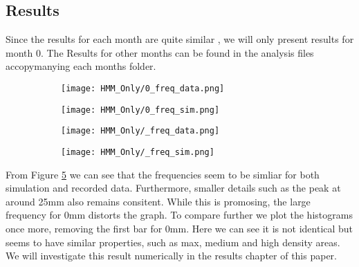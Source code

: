 \subsection{Results}

Since the results for each month are quite similar , we will only present results for month 0. The Results for other months can be found in the analysis files accopymanying each months folder. 

\begin{figure}
    \begin{subfigure}{.45\textwidth}
      \centering
      \texttt{[image: HMM\_Only/0\_freq\_data.png]}
      \caption{}
      \label{inc0:data}
    \end{subfigure}
    \begin{subfigure}{.45\textwidth}
      \centering
      \texttt{[image: HMM\_Only/0\_freq\_sim.png]}
      \caption{}
      \label{inc0:sim}
    \end{subfigure}

    \begin{subfigure}{.45\textwidth}
      \centering
      \texttt{[image: HMM\_Only/\_freq\_data.png]}
      \caption{}
      \label{inc0:n0data}
    \end{subfigure}
    \begin{subfigure}{.45\textwidth}
      \centering
      \texttt{[image: HMM\_Only/\_freq\_sim.png]}
      \caption{}
      \label{inc0:n0sim}
    \end{subfigure}
    \caption{}
    \label{inc0}
\end{figure}

From Figure \ref{inc0} we can see that the frequencies seem to be simliar for both simulation and recorded data. Furthermore, smaller details such as the peak at around 25mm also remains consitent. While this is promosing, the large frequency for 0mm distorts the graph. To compare further we plot the histograms once more, removing the first bar for 0mm. Here we can see it is not identical but seems to have similar properties, such as max, medium and high density areas. We will investigate this result numerically in the results chapter of this paper.


